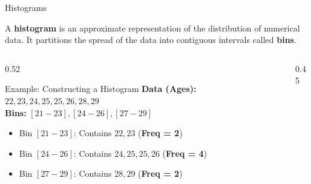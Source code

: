 \documentclass[10pt, aspectratio=169]{beamer}
\begin{document}
\begin{frame}{Histograms}
    \begin{definition}[Histogram]
        A \textbf{histogram} is an approximate representation of the distribution of numerical data. It partitions the spread of the data into contiguous intervals called \textbf{bins}.
    \end{definition}

    \begin{columns}[c]
        \begin{column}{0.52\textwidth}
            \begin{exampleblock}{Example: Constructing a Histogram}
                \textbf{Data (Ages):} $22, 23, 24, 25, 25, 26, 28, 29$ \\
                \textbf{Bins:} $[21-23], [24-26], [27-29]$
                \begin{itemize}
                    \item Bin $[21-23]$: Contains $22, 23$ (\textbf{Freq = 2})
                    \item Bin $[24-26]$: Contains $24, 25, 25, 26$ (\textbf{Freq = 4})
                    \item Bin $[27-29]$: Contains $28, 29$ (\textbf{Freq = 2})
                \end{itemize}
            \end{exampleblock}
        \end{column}
        
        \begin{column}{0.45\textwidth}
            \centering
        \end{column}
    \end{columns}
\end{frame}
\end{document}
